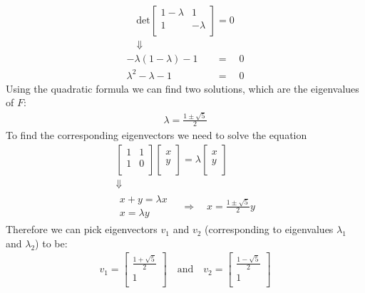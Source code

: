 \documentclass[10pt,letter]{article}
\begin{document}
\begin{gather*}
\textrm{det}
\left[ {\begin{array}{cc}
 1-\lambda & 1 \\
 1 &  -\lambda \\
\end{array} } \right]
= 0
\\ \Downarrow
\end{gather*}
\begin{align*}
-\lambda(1-\lambda) - 1\quad  &= \quad 0
\\
\lambda^2 - \lambda - 1 \quad &= \quad 0
\end{align*}
Using the quadratic formula we can find two solutions, which are the eigenvalues of $F$:
\begin{align*}
\lambda = \frac{1 \pm \sqrt{5}}{2}
\end{align*}
To find the corresponding eigenvectors we need to solve the equation
\begin{gather*}
\left[ {\begin{array}{cc}
 1 & 1 \\
 1 &  0 \\
\end{array} } \right]
\left[ {\begin{array}{c}
 x \\
 y \\
\end{array} } \right]
= \lambda
\left[ {\begin{array}{c}
 x \\
 y \\
\end{array} } \right]
\\ \Downarrow \\
\begin{aligned}
x + y = \lambda x \\
x = \lambda y
\end{aligned}
\quad \Rightarrow \quad
x = \frac{1 \pm \sqrt{5}}{2}y
\end{gather*}
Therefore we can pick eigenvectors $v_1$ and $v_2$ (corresponding to eigenvalues $\lambda_1$ and $\lambda_2$) to be:
\begin{gather*}
v_1 = 
\left[ {\begin{array}{c}
 \frac{1 + \sqrt{5}}{2} \\
 1 \\
\end{array} } \right]
\quad \textrm{and} \quad
v_2 = 
\left[ {\begin{array}{c}
 \frac{1 - \sqrt{5}}{2} \\
 1 \\
\end{array} } \right]
\end{gather*}
\end{document}
